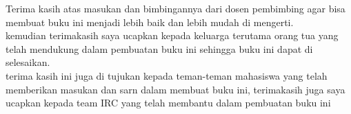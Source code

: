 Terima kasih atas masukan dan bimbingannya dari dosen pembimbing agar bisa membuat buku ini menjadi lebih baik dan lebih mudah di mengerti.\\

kemudian terimakasih saya ucapkan kepada keluarga terutama orang tua yang telah mendukung dalam pembuatan buku ini sehingga buku ini dapat di selesaikan.\\

terima kasih ini juga di tujukan kepada teman-teman mahasiswa yang telah memberikan masukan dan sarn dalam membuat buku ini, terimakasih juga saya ucapkan kepada team IRC yang telah membantu dalam pembuatan buku ini \\





